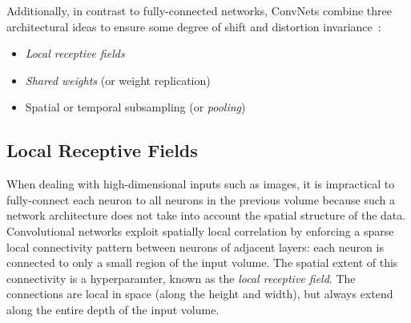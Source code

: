 \documentclass[../main.tex]{subfiles}
\begin{document}
Additionally, in contrast to fully-connected networks, ConvNets combine three
architectural ideas to ensure some degree of shift and distortion
invariance~\cite{lecun1995convolutional}:
%
\begin{itemize}
  \item \emph{Local receptive fields}
  \item \emph{Shared weights} (or weight replication)
  \item Spatial or temporal subsampling (or \emph{pooling})
\end{itemize}
%
\subsection{Local Receptive Fields}
When dealing with high-dimensional inputs such as images, it is impractical to
fully-connect each neuron to all neurons in the previous volume because such a
network architecture does not take into account the spatial structure of the
data.
%
Convolutional networks exploit spatially local correlation by enforcing a
sparse local connectivity pattern between neurons of adjacent layers: each
neuron is connected to only a small region of the input volume.
%
The spatial extent of this connectivity is a hyperparamter, known as the
\emph{local receptive field}.
%
The connections are local in space (along the height and width), but always
extend along the entire depth of the input volume.
\end{document}

